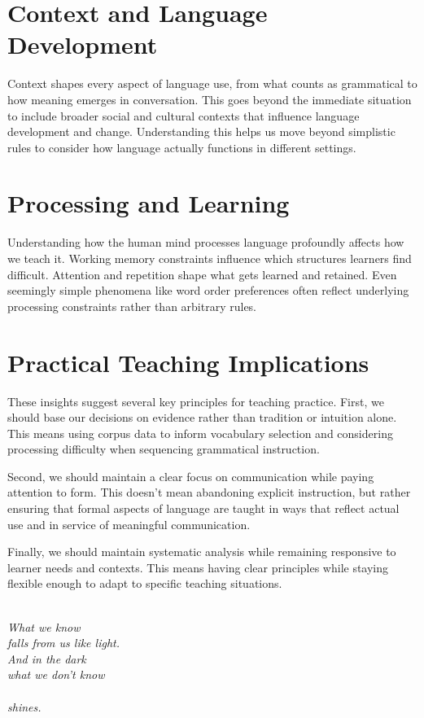 \section*{Context and Language Development}

Context shapes every aspect of language use, from what counts as grammatical to how meaning emerges in conversation. This goes beyond the immediate situation to include broader social and cultural contexts that influence language development and change. Understanding this helps us move beyond simplistic rules to consider how language actually functions in different settings.

\section*{Processing and Learning}

Understanding how the human mind processes language profoundly affects how we teach it. Working memory constraints influence which structures learners find difficult. Attention and repetition shape what gets learned and retained. Even seemingly simple phenomena like word order preferences often reflect underlying processing constraints rather than arbitrary rules.

\section{Practical Teaching Implications}

These insights suggest several key principles for teaching practice. First, we should base our decisions on evidence rather than tradition or intuition alone. This means using corpus data to inform vocabulary selection and considering processing difficulty when sequencing grammatical instruction.

Second, we should maintain a clear focus on communication while paying attention to form. This doesn't mean abandoning explicit instruction, but rather ensuring that formal aspects of language are taught in ways that reflect actual use and in service of meaningful communication.

Finally, we should maintain systematic analysis while remaining responsive to learner needs and contexts. This means having clear principles while staying flexible enough to adapt to specific teaching situations.


\cleardoublepage\newpage
\thispagestyle{empty}


\epigraph{\textit{\phantom{~}\\[10em]
What we know\\
falls from us like light.\\
\phantom{~~~~}And in the dark\\
\phantom{~~~~}what we don't know\\\\
\phantom{~~~~~~~~~~~~~~~~~~~~~~~~~~~~~~~}shines.\\}}{}
\newpage
